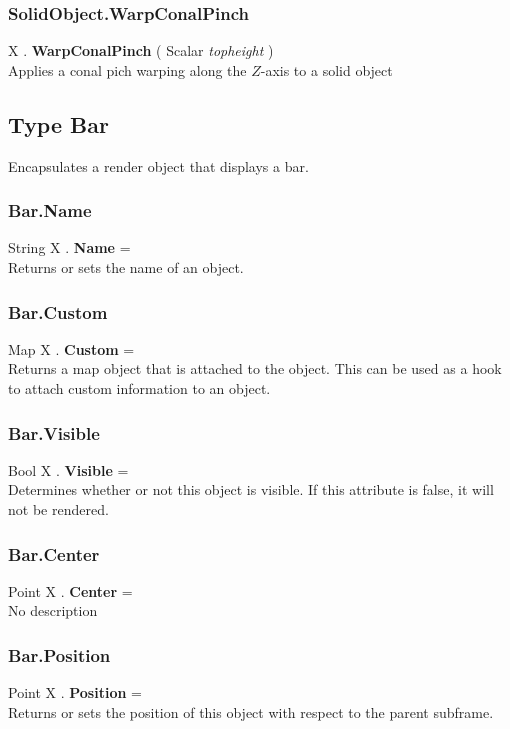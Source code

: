 \documentclass[10pt]{book}
\begin{document}
\subsubsection{SolidObject.WarpConalPinch \label{F:SolidObject:WarpConalPinch}}
X . \textbf{WarpConalPinch} ( Scalar \textit{topheight} ) \\
Applies a conal pich warping along the $Z$-axis to a solid object

\subsection{Type Bar \label{T:Bar}}
Encapsulates a render object that displays a bar.

\subsubsection{Bar.Name \label{F:Bar:Name}}
String X . \textbf{Name} = \\
Returns or sets the name of an object.

\subsubsection{Bar.Custom \label{F:Bar:Custom}}
Map X . \textbf{Custom} = \\
Returns a map object that is attached to the object. This can be used as a hook to attach custom information to an object.


\subsubsection{Bar.Visible \label{F:Bar:Visible}}
Bool X . \textbf{Visible} = \\
Determines whether or not this object is visible. If this attribute is false, it will not be rendered.

\subsubsection{Bar.Center \label{F:Bar:Center}}
Point X . \textbf{Center} = \\
No description

\subsubsection{Bar.Position \label{F:Bar:Position}}
Point X . \textbf{Position} = \\
Returns or sets the position of this object with respect to the parent subframe.
\end{document}

